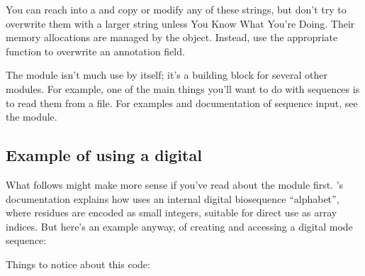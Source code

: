 You can reach into a  and copy or modify any of these
strings, but don't try to overwrite them with a larger string unless
You Know What You're Doing. Their memory allocations are managed by
the  object. Instead, use the appropriate
 function to overwrite an annotation field.

The  module isn't much use by itself; it's a building block
for several other modules. For example, one of the main things you'll
want to do with sequences is to read them from a file. For examples
and documentation of sequence input, see the  module.


\subsection{Example of using a digital }

What follows might make more sense if you've read about the
 module first. 's documentation
explains how \Easel uses an internal digital biosequence ``alphabet'',
where residues are encoded as small integers, suitable for direct use
as array indices. But here's an example anyway, of creating and
accessing a digital mode sequence:



Things to notice about this code:

